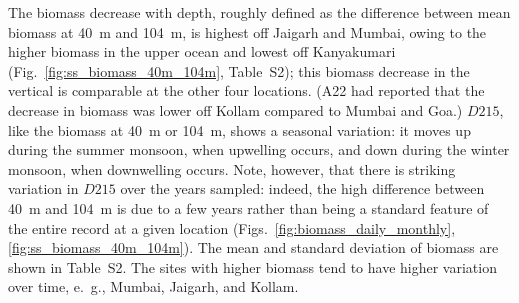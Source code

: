 \documentclass[authoryear,review,11pt]{elsarticle}
\begin{document}


The biomass decrease with depth, roughly defined as the difference between mean biomass at 40~m and 104~m, is highest off Jaigarh and Mumbai, owing to the higher biomass in the upper ocean and lowest off Kanyakumari (Fig.~\ref{fig:ss_biomass_40m_104m}, Table~S2); this biomass decrease in the vertical is comparable at the other four locations. (A22 had reported that the decrease in biomass was lower off Kollam compared to Mumbai and Goa.) $D215$, like the biomass at 40~m or 104~m, shows a seasonal variation: it moves up during the summer monsoon, when upwelling occurs, and down during the winter monsoon, when downwelling occurs.  Note, however, that there is striking variation in $D215$ over the years sampled: indeed, the high difference between 40~m and 104~m is due to a few years rather than being a standard feature of the entire record at a given location (Figs.~\ref{fig:biomass_daily_monthly},\ref{fig:ss_biomass_40m_104m}). The mean and standard deviation of biomass are shown in Table~S2. The sites with higher biomass tend to have higher variation over time, e.~g., Mumbai, Jaigarh, and Kollam.
\end{document}
